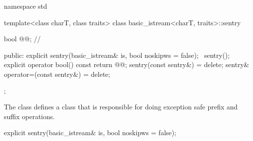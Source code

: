 %
%
\begin{codeblock}
namespace std {
  template<class charT, class traits>
  class basic_istream<charT, traits>::sentry {
    bool @@;                   // \expos

  public:
    explicit sentry(basic_istream& is, bool noskipws = false);
    ~sentry();
    explicit operator bool() const { return @@; }
    sentry(const sentry&) = delete;
    sentry& operator=(const sentry&) = delete;
  };
}
\end{codeblock}

\begin{itemdescr}
\pnum
The class
defines a class that is responsible for doing exception safe prefix and suffix
operations.
\end{itemdescr}

%
%
\begin{itemdecl}
explicit sentry(basic_istream& is, bool noskipws = false);
\end{itemdecl}


